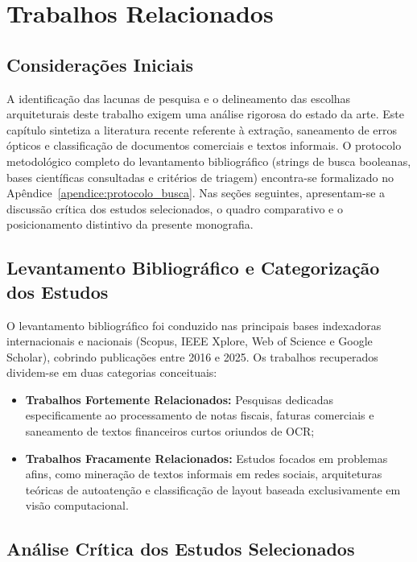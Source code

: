 \documentclass[
	12pt,				
	openright,			
	oneside,			
	a4paper,			
	english,			
	brazil				
	]{abntex2}
\begin{document}
\chapter{Trabalhos Relacionados}
\label{chp:trabalhos_relacionados}

\section{Considerações Iniciais}
\label{sec:rel_consideracoes_iniciais}

A identificação das lacunas de pesquisa e o delineamento das escolhas arquiteturais deste trabalho exigem uma análise rigorosa do estado da arte. Este capítulo sintetiza a literatura recente referente à extração, saneamento de erros ópticos e classificação de documentos comerciais e textos informais. O protocolo metodológico completo do levantamento bibliográfico (strings de busca booleanas, bases científicas consultadas e critérios de triagem) encontra-se formalizado no Apêndice~\ref{apendice:protocolo_busca}. Nas seções seguintes, apresentam-se a discussão crítica dos estudos selecionados, o quadro comparativo e o posicionamento distintivo da presente monografia.

\section{Levantamento Bibliográfico e Categorização dos Estudos}
\label{sec:rel_levantamento}

O levantamento bibliográfico foi conduzido nas principais bases indexadoras internacionais e nacionais (Scopus, IEEE Xplore, Web of Science e Google Scholar), cobrindo publicações entre 2016 e 2025. Os trabalhos recuperados dividem-se em duas categorias conceituais:
\begin{itemize}
    \item \textbf{Trabalhos Fortemente Relacionados:} Pesquisas dedicadas especificamente ao processamento de notas fiscais, faturas comerciais e saneamento de textos financeiros curtos oriundos de OCR;
    \item \textbf{Trabalhos Fracamente Relacionados:} Estudos focados em problemas afins, como mineração de textos informais em redes sociais, arquiteturas teóricas de autoatenção e classificação de layout baseada exclusivamente em visão computacional.
\end{itemize}

\section{Análise Crítica dos Estudos Selecionados}
\label{sec:rel_analise_estudos}
\end{document}
